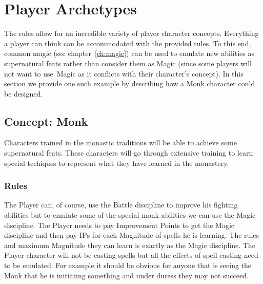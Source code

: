 



\section{Player Archetypes}

The rules allow for an incredible variety of player character concepts. Everything a player can think can be accommodated with the provided rules. To this end, common magic (see chapter~\ref{ch:magic}) can be used to emulate new abilities as supernatural feats rather than consider them as Magic (since some players will not want to use Magic as it conflicts with their character's concept). In this section we provide one such example by describing how a Monk character could be designed.

\subsection{Concept: Monk}
Characters trained in the monastic traditions will be able to achieve some supernatural feats. These characters will go through extensive training to learn special techiques to represent what they have learned in the monastery.

\subsubsection{Rules}
The Player can, of course, use the Battle discipline to improve his fighting abilities but to emulate some of the special monk abilities we can use the Magic discipline. The Player needs to pay Improvement Points to get the Magic discipline and then pay IPs for each Magnitude of spells he is learning. The rules and maximum Magnitude they can learn is exactly as the Magic discipline. The Player character will not be casting spells but all the effects of spell casting need to be emulated. For example it should be obvious for anyone that is seeing the Monk that he is initiating something and under duress they may not succeed.

